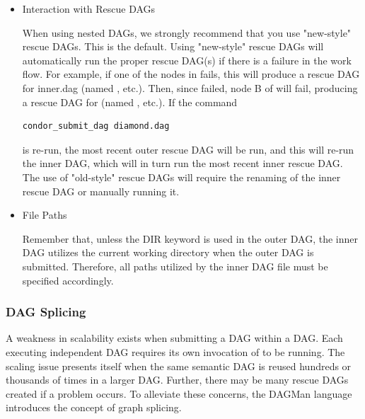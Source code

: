 \begin{itemize}
\item{Interaction with Rescue DAGs}

When using nested DAGs, we strongly recommend that you use
"new-style" rescue DAGs. This is the default.  Using "new-style"
rescue DAGs will automatically run the proper rescue DAG(s) if
there is a failure in the work flow.  For example, if one of the
nodes in  fails, this will produce a rescue
DAG for inner.dag (named , etc.).  Then,
since  failed, node B of  will fail,
producing a rescue DAG for 
(named , etc.).  
If the command
\begin{verbatim}
condor_submit_dag diamond.dag
\end{verbatim}
is re-run, the most recent outer rescue
DAG will be run, and this will re-run the inner DAG, which will
in turn run the most recent inner rescue DAG.  
The use of
"old-style" rescue DAGs will require the renaming of the 
inner rescue DAG or manually running it.

\item{File Paths}

Remember that, unless the DIR keyword is used in the outer DAG,
the inner DAG utilizes the current working directory when the outer DAG
is submitted.
Therefore, all paths utilized by the inner DAG file
must be specified accordingly.

\end{itemize}

\subsubsection{\label{sec:DAGSplicing}DAG Splicing}

A weakness in scalability exists when submitting a DAG within a DAG.
Each executing independent DAG requires its own invocation of
 to be running.
The scaling issue presents itself when
the same semantic DAG is reused hundreds or thousands of times
in a larger DAG.
Further, there may be many rescue DAGs created if a problem occurs.
To alleviate these concerns, the DAGMan language introduces
the concept of graph splicing.

